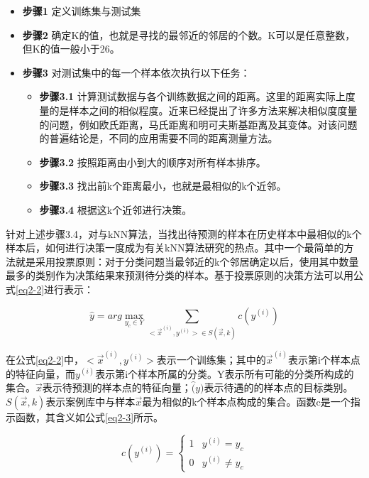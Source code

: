 \begin{itemize}

\item \textbf{步骤1} 定义训练集与测试集
\item \textbf{步骤2} 确定K的值，也就是寻找的最邻近的邻居的个数。K可以是任意整数，但K的值一般小于26。
\item \textbf{步骤3} 对测试集中的每一个样本依次执行以下任务：
    \begin{itemize}
    
    \item \textbf{步骤3.1} 计算测试数据与各个训练数据之间的距离。这里的距离实际上度量的是样本之间的相似程度。近来已经提出了许多方法来解决相似度度量的问题，例如欧氏距离，马氏距离和明可夫斯基距离及其变体。对该问题的普遍结论是，不同的应用需要不同的距离测量方法\cite{Quinlan1986Induction,Zhang2006Clustering,ZhuMissing}。
    \item \textbf{步骤3.2} 按照距离由小到大的顺序对所有样本排序。
    \item \textbf{步骤3.3} 找出前k个距离最小，也就是最相似的k个近邻。
    \item \textbf{步骤3.4} 根据这k个近邻进行决策。
    \end{itemize}
\end{itemize}

针对上述步骤3.4，对与kNN算法，当找出待预测的样本在历史样本中最相似的k个样本后，如何进行决策一度成为有关kNN算法研究的热点。其中一个最简单的方法就是采用投票原则：对于分类问题当最邻近的k个邻居确定以后，使用其中数量最多的类别作为决策结果来预测待分类的样本。基于投票原则的决策方法可以用公式\ref{eq2-2}进行表示：

\begin{equation}
\label{eq2-2}
\hat{y}=arg\max_{y_c\in Y} \sum_{{<\Vec{x}^{(i)},y^{(i)}>}\in S(\Vec{x},k)} c(y^{(i)})
\end{equation}

在公式\ref{eq2-2}中，${<\Vec{x}^{(i)},y^{(i)}>}$表示一个训练集；其中的${\Vec{x}^{(i)}}$表示第i个样本点的特征向量，而${y^{(i)}}$表示第i个样本所属的分类。Y表示所有可能的分类所构成的集合。${\Vec{x}}$表示待预测的样本点的特征向量；${\hat(y)}$表示待遇的的样本点的目标类别。
${S(\Vec{x},k)}$表示案例库中与样本${\Vec{x}}$最为相似的k个样本点构成的集合。函数c是一个指示函数，其含义如公式\ref{eq2-3}所示。

\begin{equation}
\label{eq2-3}
c(y^{(i)})=
\begin{cases}
1& {y^{(i)}=y_c}\\
0& {y^{(i)} \ne y_c}
\end{cases}
\end{equation}

